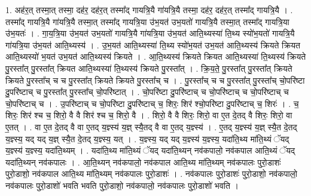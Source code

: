 \documentclass[17pt]{extarticle}
\begin{document}
1. अह॑र॒त् तस्मा॒त् तस्मा॒ दह॑र॒ दह॑र॒त् तस्मा᳚द् गायत्रि॒यै गा॑यत्रि॒यै तस्मा॒ दह॑र॒ दह॑र॒त् तस्मा᳚द् गायत्रि॒यै । . तस्मा᳚द् गायत्रि॒यै गा॑यत्रि॒यै तस्मा॒त् तस्मा᳚द् गायत्रि॒या उ॑भ॒यत॑ उभ॒यतो॑ गायत्रि॒यै तस्मा॒त् तस्मा᳚द् गायत्रि॒या उ॑भ॒यतः॑ । . गा॒य॒त्रि॒या उ॑भ॒यत॑ उभ॒यतो॑ गायत्रि॒यै गा॑यत्रि॒या उ॑भ॒यत॑ आति॒थ्यस्या॑ ति॒थ्य स्यो॑भ॒यतो॑ गायत्रि॒यै गा॑यत्रि॒या उ॑भ॒यत॑ आति॒थ्यस्य॑ । . उ॒भ॒यत॑ आति॒थ्यस्या॑ ति॒थ्य स्यो॑भ॒यत॑ उभ॒यत॑ आति॒थ्यस्य॑ क्रियते क्रियत आति॒थ्यस्यो॑ भ॒यत॑ उभ॒यत॑ आति॒थ्यस्य॑ क्रियते । . आ॒ति॒थ्यस्य॑ क्रियते क्रियत आति॒थ्यस्या॑ ति॒थ्यस्य॑ क्रियते पु॒रस्ता᳚त् पु॒रस्ता᳚त् क्रियत आति॒थ्यस्या॑ ति॒थ्यस्य॑ क्रियते पु॒रस्ता᳚त् । . क्रि॒य॒ते॒ पु॒रस्ता᳚त् पु॒रस्ता᳚त् क्रियते क्रियते पु॒रस्ता᳚च् च च पु॒रस्ता᳚त् क्रियते क्रियते पु॒रस्ता᳚च् च । . पु॒रस्ता᳚च् च च पु॒रस्ता᳚त् पु॒रस्ता᳚च् चो॒परि॑ष्टा दु॒परि॑ष्टाच् च पु॒रस्ता᳚त् पु॒रस्ता᳚च् चो॒परि॑ष्टात् । . चो॒परि॑ष्टा दु॒परि॑ष्टाच् च चो॒परि॑ष्टाच् च चो॒परि॑ष्टाच् च चो॒परि॑ष्टाच् च । . उ॒परि॑ष्टाच् च चो॒परि॑ष्टा दु॒परि॑ष्टाच् च॒ शिरः॒ शिर॑ श्चो॒परि॑ष्टा दु॒परि॑ष्टाच् च॒ शिरः॑ । . च॒ शिरः॒ शिर॑ श्च च॒ शिरो॒ वै वै शिर॑ श्च च॒ शिरो॒ वै । . शिरो॒ वै वै शिरः॒ शिरो॒ वा ए॒त दे॒तद् वै शिरः॒ शिरो॒ वा ए॒तत् । . वा ए॒त दे॒तद् वै वा ए॒तद् य॒ज्ञ्स्य॑ य॒ज्ञ् स्यै॒तद् वै वा ए॒तद् य॒ज्ञ्स्य॑ । . ए॒तद् य॒ज्ञ्स्य॑ य॒ज्ञ् स्यै॒त दे॒तद् य॒ज्ञ्स्य॒ यद् यद् य॒ज्ञ् स्यै॒त दे॒तद् य॒ज्ञ्स्य॒ यत् । . य॒ज्ञ्स्य॒ यद् यद् य॒ज्ञ्स्य॑ य॒ज्ञ्स्य॒ यदा॑ति॒थ्य मा॑ति॒थ्यं ॅयद् य॒ज्ञ्स्य॑ य॒ज्ञ्स्य॒ यदा॑ति॒थ्यम् । . यदा॑ति॒थ्य मा॑ति॒थ्यं ॅयद् यदा॑ति॒थ्यन् नव॑कपालो॒ नव॑कपाल आति॒थ्यं ॅयद् यदा॑ति॒थ्यन् नव॑कपालः । . आ॒ति॒थ्यन् नव॑कपालो॒ नव॑कपाल आति॒थ्य मा॑ति॒थ्यम् नव॑कपालः पुरो॒डाशः॑ पुरो॒डाशो॒ नव॑कपाल आति॒थ्य मा॑ति॒थ्यम् नव॑कपालः पुरो॒डाशः॑ । . नव॑कपालः पुरो॒डाशः॑ पुरो॒डाशो॒ नव॑कपालो॒ नव॑कपालः पुरो॒डाशो॑ भवति भवति पुरो॒डाशो॒ नव॑कपालो॒ नव॑कपालः पुरो॒डाशो॑ भवति । \newline
\end{document}
